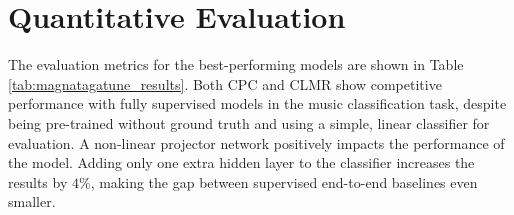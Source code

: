 \documentclass{report}
\newcommand{\ra}[1]{\renewcommand{\arraystretch}{#1}}
\begin{document}
\begin{table}[t]
    \centering
    \ra{1.3}
    \caption{Tag prediction performance on the Million Song Dataset (MSD), compared with fully supervised models$^\dagger$ trained on raw audio waveforms. The ROC-AUC and PR-AUC scores are tag-wise scores obtained by end-to-end training for the supervised models. For the self-supervised models, the scores are obtained by training a \emph{linear}, logistic regression classifier on the MSD dataset using the representations from self-supervised pre-training. Scores in parenthesis show performance when adding one hidden layer to the logistic regression classifier, making it a simple multi-layer perceptron.}
    \label{tab:msd_results}
\end{table}



\section{Quantitative Evaluation}
The evaluation metrics for the best-performing models are shown in Table \ref{tab:magnatagatune_results}. Both CPC and CLMR show competitive performance with fully supervised models in the music classification task, despite being pre-trained without ground truth and using a simple, linear classifier for evaluation. A non-linear projector network positively impacts the performance of the model. Adding only one extra hidden layer to the classifier increases the results by $4\%$, making the gap between supervised end-to-end baselines even smaller.
\end{document}
